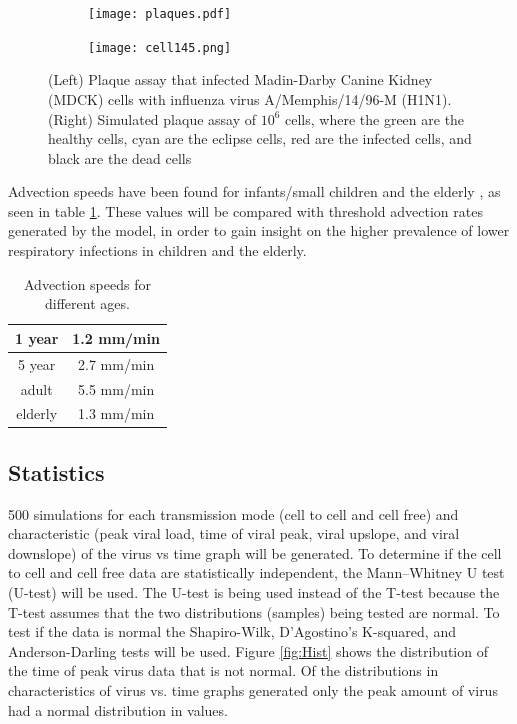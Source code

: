 \documentclass[a4paper]{article}
\begin{document}
\begin{figure}[h]
    \centering
    \begin{subfigure}[b]{0.4\linewidth}
        \texttt{[image: plaques.pdf]}
        \caption{}
        \label{fig:ActualPlaques}
    \end{subfigure}
    \begin{subfigure}[b]{0.4\linewidth}
        \texttt{[image: cell145.png]}
        \caption{}
        \label{fig:SimulatedPlaques}
    \end{subfigure}
    \caption{(Left) Plaque assay that infected Madin-Darby Canine Kidney (MDCK) cells with influenza virus A/Memphis/14/96-M (H1N1). (Right) Simulated plaque assay of $10^{6}$ cells, where the green are the healthy cells, cyan are the eclipse cells, red are the infected cells, and black are the dead cells}
    \label{fig:Plaques}
\end{figure}

Advection speeds have been found for infants/small children \cite{Sturm} and the elderly \cite{Puchelle}, as seen in table \ref{tab:AdvectionSpeeds}. These values will be compared with threshold advection rates generated by the model, in order to gain insight on the higher prevalence of lower respiratory infections in children and the elderly.

\begin{table}[h]
    \centering
    \caption{Advection speeds for different ages.}
    \begin{tabular}{|c|c|}
        \hline
        1 year  & 1.2 mm/min\\
        \hline
        5 year  & 2.7 mm/min\\
        \hline
        adult  & 5.5 mm/min\\
        \hline
        elderly  & 1.3 mm/min\\
        \hline
    \end{tabular}
    \label{tab:AdvectionSpeeds}
\end{table}

\subsection{Statistics}
500 simulations for each transmission mode (cell to cell and cell free) and characteristic (peak viral load, time of viral peak, viral upslope, and viral downslope) of the virus vs time graph will be generated. To determine if the cell to cell and cell free data are statistically independent, the Mann–Whitney U test (U-test) will be used. The U-test is being used instead of the T-test because the T-test assumes that the two distributions (samples) being tested are normal. To test if the data is normal the Shapiro-Wilk, D'Agostino's K-squared, and Anderson-Darling tests will be used. Figure \ref{fig:Hist} shows the distribution of the time of peak virus data that is not normal. Of the distributions in characteristics of virus vs. time graphs generated only the peak amount of virus had a normal distribution in values.
\end{document}
